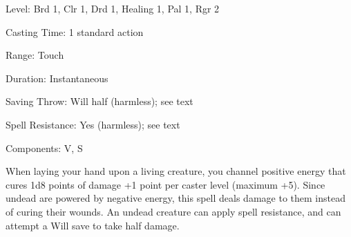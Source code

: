 
\begin{description*}
\item[Level:] Brd 1, Clr 1, Drd 1, Healing 1, Pal 1, Rgr 2
\item[Casting Time:] 1 standard action
\item[Range:] Touch
\item[Duration:] Instantaneous
\item[Saving Throw:] Will half (harmless); see text
\item[Spell Resistance:] Yes (harmless); see text
\item[Components:] V, S
\end{description*}

When laying your hand upon a living creature, you channel positive energy that
cures 1d8 points of damage +1 point per caster level (maximum +5).
Since undead are powered by negative energy, this spell deals damage to them instead
of curing their wounds. An undead creature can apply spell resistance, and can
attempt a Will save to take half damage.